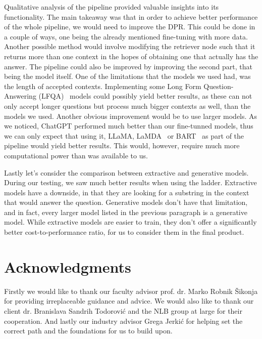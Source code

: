 \documentclass[fleqn,moreauthors,10pt]{ds_report}
\begin{document}
\noindent Qualitative analysis of the pipeline provided valuable insights into its functionality. The main takeaway was that in order to achieve better performance of the whole pipeline, we would need to improve the DPR. This could be done in a couple of ways, one being the already mentioned fine-tuning with more data. Another possible method would involve modifying the retriever node such that it returns more than one context in the hopes of obtaining one that actually has the answer. The pipeline could also be improved by improving the second part, that being the model itself. One of the limitations that the models we used had, was the length of accepted contexts. Implementing some Long Form Question-Answering (LFQA)~\cite{faneli5} models could possibly yield better results, as these can not only accept longer questions but process much bigger contexts as well, than the models we used. Another obvious improvement would be to use larger models. As we noticed, ChatGPT performed much better than our fine-tunned models, thus we can only expect that using it, LLaMA, LaMDA~\cite{thoppilan2022lamda} or BART~\cite{lewis2019bart} as part of the pipeline would yield better results. This would, however, require much more computational power than was available to us.

\noindent Lastly let's consider the comparison between extractive and generative models. During our testing, we saw much better results when using the ladder. Extractive models have a downside, in that they are looking for a substring in the context that would answer the question. Generative models don't have that limitation, and in fact, every larger model listed in the previous paragraph is a generative model. While extractive models are easier to train, they don't offer a significantly better cost-to-performance ratio, for us to consider them in the final product.





\section*{Acknowledgments}
Firstly we would like to thank our faculty advisor prof. dr. Marko Robnik Šikonja for providing irreplaceable guidance and advice. We would also like to thank our client dr. Branislava Sandrih Todorović and the NLB group at large for their cooperation. And lastly our industry advisor Grega Jerkić for helping set the correct path and the foundations for us to build upon.
\end{document}
